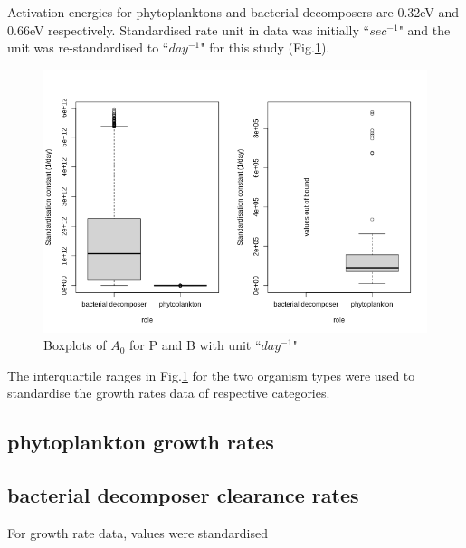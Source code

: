 \documentclass[../thesis.tex]{subfiles} %
\begin{document}
Activation energies for phytoplanktons and bacterial decomposers are 0.32eV and 0.66eV respectively.\autocite{regaudie2012temperature}  Standardised rate unit in data was initially ``$sec^{-1}$" and the unit was re-standardised to ``$day^{-1}$" for this study (Fig.\ref{growStdVal}).

\begin{figure}[H]
    \centering
    \includegraphics[width=\linewidth]{../result/stdCst.png}
    \caption[Boxplot of standardised $A_0$]{Boxplots of $A_0$ for P and B with unit ``$day^{-1}$"}
    \label{growStdVal}
\end{figure}

The interquartile ranges in Fig.\ref{growStdVal} for the two organism types were used to standardise the growth rates data of respective categories.

\subsection{phytoplankton growth rates}


\subsection{bacterial decomposer clearance rates}
For growth rate data, values were standardised
\end{document}
